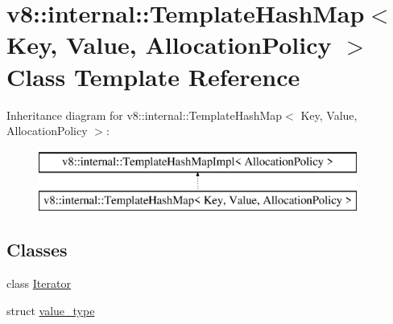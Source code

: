 \hypertarget{classv8_1_1internal_1_1_template_hash_map}{}\section{v8\+:\+:internal\+:\+:Template\+Hash\+Map$<$ Key, Value, Allocation\+Policy $>$ Class Template Reference}
\label{classv8_1_1internal_1_1_template_hash_map}
Inheritance diagram for v8\+:\+:internal\+:\+:Template\+Hash\+Map$<$ Key, Value, Allocation\+Policy $>$\+:\begin{figure}[H]
\begin{center}
\leavevmode
\includegraphics[height=2.000000cm]{classv8_1_1internal_1_1_template_hash_map}
\end{center}
\end{figure}
\subsection*{Classes}
\begin{DoxyCompactItemize}
\item 
class \hyperlink{classv8_1_1internal_1_1_template_hash_map_1_1_iterator}{Iterator}
\item 
struct \hyperlink{structv8_1_1internal_1_1_template_hash_map_1_1value__type}{value\+\_\+type}
\end{DoxyCompactItemize}
